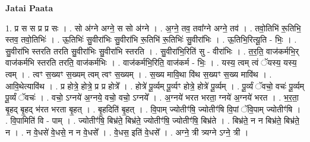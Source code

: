 \documentclass[17pt]{extarticle}
\begin{document}
\textbf{Jatai Paata} \newline

1. प्र स स प्र प्र सः । . सो अ॑ग्ने अग्ने॒ स सो अ॑ग्ने । . अ॒ग्ने॒ तव॒ तवा᳚ग्ने अग्ने॒ तव॑ । . तवो॒तिभि॑ रू॒तिभि॒ स्तव॒ तवो॒तिभिः॑ । . ऊ॒तिभिः॑ सु॒वीरा॑भिः सु॒वीरा॑भि रू॒तिभि॑ रू॒तिभिः॑ सु॒वीरा॑भिः । . ऊ॒तिभि॒रित्यू॒ति - भिः॒ । . सु॒वीरा॑भि स्तरति तरति सु॒वीरा॑भिः सु॒वीरा॑भि स्तरति । . सु॒वीरा॑भि॒रिति॑ सु - वीरा॑भिः । . त॒र॒ति॒ वाज॑कर्मभि॒र् वाज॑कर्मभि स्तरति तरति॒ वाज॑कर्मभिः । . वाज॑कर्मभि॒रिति॒ वाज॑कर्म - भिः॒ । . यस्य॒ त्वम् त्वं ॅयस्य॒ यस्य॒ त्वम् । . त्वꣳ स॒ख्यꣳ स॒ख्यम् त्वम् त्वꣳ स॒ख्यम् । . स॒ख्य मावि॒था वि॑थ स॒ख्यꣳ स॒ख्य मावि॑थ । . आवि॒थेत्यावि॑थ । . प्र होत्रे॒ होत्रे॒ प्र प्र होत्रे᳚ । . होत्रे॑ पू॒र्व्यम् पू॒र्व्यꣳ होत्रे॒ होत्रे॑ पू॒र्व्यम् । . पू॒र्व्यं ॅवचो॒ वचः॑ पू॒र्व्यम् पू॒र्व्यं ॅवचः॑ । . वचो॒ ऽग्नये॑ अ॒ग्नये॒ वचो॒ वचो॒ ऽग्नये᳚ । . अ॒ग्नये॑ भरत भरता॒ ग्नये॑ अ॒ग्नये॑ भरत । . भ॒र॒ता॒ बृ॒हद् बृ॒हद् भ॑रत भरता बृ॒हत् । . बृ॒हदिति॑ बृ॒हत् । . वि॒पाम् ज्योतीꣳ॑षि॒ ज्योतीꣳ॑षि वि॒पां ॅवि॒पाम् ज्योतीꣳ॑षि । . वि॒पामिति॑ वि - पाम् । . ज्योतीꣳ॑षि॒ बिभ्र॑ते॒ बिभ्र॑ते॒ ज्योतीꣳ॑षि॒ ज्योतीꣳ॑षि॒ बिभ्र॑ते । . बिभ्र॑ते॒ न न बिभ्र॑ते॒ बिभ्र॑ते॒ न । . न वे॒धसे॑ वे॒धसे॒ न न वे॒धसे᳚ । . वे॒धस॒ इति॑ वे॒धसे᳚ । . अग्ने॒ त्री त्र्यग्ने ऽग्ने॒ त्री । \newline
\end{document}
